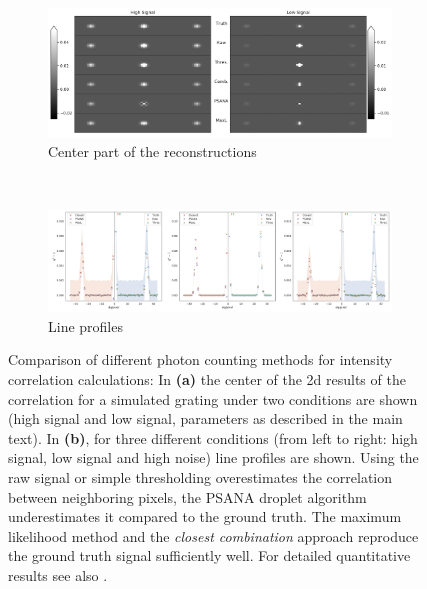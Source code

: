 \begin{figure}
	\centering
	\begin{subfigure}[b]{0.85\textwidth}
		\includegraphics[width=\linewidth]{images/photonreconimg.pdf}	
		\caption{Center part of the reconstructions}
		\label{fig:photonreconimg}
	\end{subfigure}
	\\
	\begin{subfigure}[b]{0.95\textwidth}
		\includegraphics[width=\linewidth]{images/photonrecon.pdf}
		\caption{Line profiles}
		\label{fig:photonrecon}
	\end{subfigure}	
	
	\caption[Comparison of different photon counting methods for intensity correlation calculations]{Comparison of different photon counting methods for intensity correlation calculations: In \textbf{(a)} the center of the 2d results of the correlation for a simulated grating under two conditions are shown (high signal and low signal, parameters as described in the main text). In  \textbf{(b)}, for three different conditions (from left to right: high signal, low signal and high noise) line profiles are shown. Using the raw signal or simple thresholding overestimates the correlation between neighboring pixels, the PSANA droplet algorithm underestimates it compared to the ground truth. The maximum likelihood method and the \textit{closest combination} approach reproduce the ground truth signal sufficiently well. For detailed quantitative results see also .}
\end{figure}
